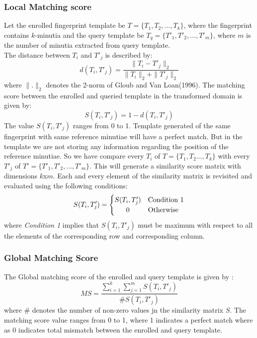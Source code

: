 \documentclass[14pt, oneside]{article}   	%
\begin{document}
\subsubsection{Local Matching score}
Let the enrolled fingerprint template be $T=\{T_1,T_2,\ldots,T_k\}$, where the fingerprint contains $k$-minutia and the query template be $T_q=\{T'_1,T'_2,\ldots,T'_m\}$, where $m$ is the number of minutia extracted from query template.\\
The distance between $T_i$ and $T'_j$ is described by:
\begin{equation}
d(T_i,T'_j)=\frac{\| T_i - T'_j\|_2}{\|T_i\|_2 +\|T'_j\|_2}
\end{equation}
where $\|.\|_2$ denotes the 2-norm of Gloub and Van Loan(1996). The matching score between the enrolled and queried template in the transformed domain is given by:\\
\begin{equation}
S(T_i,T'_j)=1-d(T_i,T'_j) 
\end{equation}
The value $S(T_i,T'_j)$ ranges from 0 to 1. Template generated of the same fingerprint with same reference minutiae will have a perfect match. But in the template we are not storing any information regarding the position of the reference minutiae. So we have compare every $T_i$ of $T=\{T_1,T_2\ldots,T_k\}$ with every $T'_j$ of $T'=\{T'_1,T'_2,\ldots,T'_m\}$. This will generate a similarity score matrix with dimensions $k$x$m$.  Each and every element of the similarity matrix is revisited and evaluated using the following conditions:
\begin{equation}
S(T_i,T'_j)=\left\{\def\arraystretch{1.2}%
  \begin{array}{@{}c@{\quad}l@{}}
    S(T_i,T'_j) & \text{Condition 1}\\
    0 & \text{Otherwise}\\
  \end{array}\right.
\end{equation}
where \textit{Condition 1} implies that $S(T_i,T'_j)$ must be maximum with respect to all the elements of the corresponding row and corresponding column.
\subsubsection{Global Matching Score}
The Global matching score of the enrolled and query template is given by :\\
\begin{equation}
MS=\frac{\sum_{i=1}^{k} \sum_{j=1}^{m}S(T_i,T'_j)}{\#S(T_i,T'_j)}
\end{equation}
where \# denotes the number of non-zero values jn the similarity matrix $S$. The matching score value ranges from 0 to 1, where 1 indicates a perfect match where as 0 indicates total mismatch between the enrolled and query template.
\end{document}
